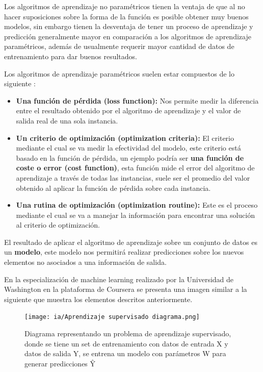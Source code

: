 \documentclass[11pt,fleqn]{book} %
\begin{document}
Los algoritmos de aprendizaje no paramétricos tienen la ventaja de que al no hacer suposiciones sobre la forma de la función es posible obtener muy buenos modelos, sin embargo tienen la desventaja de tener un proceso de aprendizaje y predicción generalmente mayor en comparación a los algoritmos de aprendizaje paramétricos, además de usualmente requerir mayor cantidad de datos de entrenamiento para dar buenos resultados.

Los algoritmos de aprendizaje paramétricos suelen estar compuestos de lo siguiente \cite{burkov2019hundred}:

\begin{itemize}
\item \textbf{Una función de pérdida (loss function):} Nos permite medir la diferencia entre el resultado obtenido por el algoritmo de aprendizaje y el valor de salida real de una sola instancia.
\item \textbf{Un criterio de optimización (optimization criteria):} El criterio mediante el cual se va medir la efectividad del modelo, este criterio está basado en la función de pérdida, un ejemplo podría ser \textbf{una función de coste o error (cost function)}, esta función mide el error del algoritmo de aprendizaje a través de todas las instancias, suele ser el promedio del valor obtenido al aplicar la función de pérdida sobre cada instancia.
\item \textbf{Una rutina de optimización (optimization routine):} Este es el proceso mediante el cual se va a manejar la información para encontrar una solución al criterio de optimización.
\end{itemize}

El resultado de aplicar el algoritmo de aprendizaje sobre un conjunto de datos es un \textbf{modelo}, este modelo nos permitirá realizar predicciones sobre los nuevos elementos no asociados a una información de salida.

En la especialización de machine learning realizado por la Universidad de Washington en la plataforma de Coursera se presenta una imagen similar a la siguiente que muestra los elementos descritos anteriormente.

\begin{figure}[ht]
\centering\texttt{[image: ia/Aprendizaje supervisado diagrama.png]}
\caption{Diagrama representando un problema de aprendizaje supervisado, donde se tiene un set de entrenamiento con datos de entrada X y datos de salida Y, se entrena un modelo con parámetros W para generar predicciones Ŷ}

\label{fig:Aprendizaje-supervisado-diagrama} 
\end{figure}
\FloatBarrier
\end{document}
